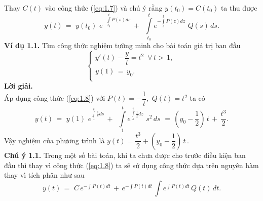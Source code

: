 Thay $C(t)$ vào công thức (\ref{eq:1.7}) và chú ý rằng $y({{t}_{0}})=C({{t}_{0}})$ ta thu được 
\begin{equation}
	y(t)\,=\,\,y({{t}_{0}})\,\,{{e}^{-\int\limits_{{{t}_{0}}}^{t}{P(s)ds}}}\,+\,\,\,\int\limits_{{{t}_{0}}}^{t}{{{e}^{-\int\limits_{s}^{t}{P(z)dz}}}}\,\,Q(s)\,ds.
	\label{eq:1.8}
\end{equation}
\textbf{Ví dụ 1.1.} Tìm công thức nghiệm tường minh cho bài toán giá trị ban đầu
\[\left\{ \begin{array}{l}
	 y'(t)-\dfrac{y}{t}={{t}^{2}}\,\,\,\forall \,t>\,1,\, \\ 
	 y(1)\,=\,{{y}_{0}}. \\ 
\end{array} \right.\]
\textbf{Lời giải.}\\
Áp dụng công thức (\ref{eq:1.8}) với $P\left( t \right)=-\dfrac{1}{t},\,\,Q(t)={{t}^{2}}$ ta có \[y(t)\,=\,\,y(1)\,\,{{e}^{\int\limits_{1}^{t}{\frac{1}{s}ds}}}\,+\,\,\,\int\limits_{1}^{t}{{{e}^{\int\limits_{s}^{t}{\frac{1}{z}dz}}}}\,\,{{s}^{2}}\,ds\,\,=\,\left( {{y}_{0}}-\dfrac{1}{2} \right)\,t\,+\,\dfrac{{{t}^{3}}}{2}.\]
Vậy nghiệm của phương trình là $y(t)=\dfrac{{{t}^{3}}}{2}+\left( {{y}_{0}}-\dfrac{1}{2} \right)\,t\,.$\\
\textbf{Chú ý 1.1.
} Trong một số bài toán, khi ta chưa được cho trước điều kiện ban đầu thì thay vì công thức (\ref{eq:1.8}) ta sẽ sử dụng công thức dựa trên nguyên hàm thay vì tích phân như sau
\begin{equation}
	y(t)\,=\,\,C\,{{e}^{-\int{P(t)dt}}}\,+\,{{e}^{-\int{P(t)dt}}}\,\int{{{e}^{\int{P(t)dt}}}}\,Q(t)\,dt.
\label{eq:1.9}
\end{equation}
